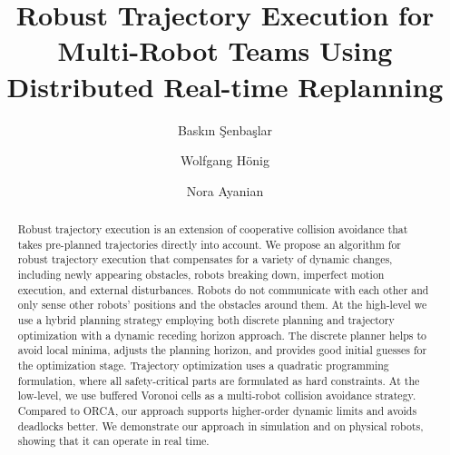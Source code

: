 \documentclass{svproc}
\begin{document}
\mainmatter              %
\title{Robust Trajectory Execution for Multi-Robot Teams Using Distributed Real-time Replanning}
%
\author{Baskın Şenbaşlar \and Wolfgang H\"onig \and
Nora Ayanian}
%
%
%

\maketitle              %

\begin{abstract}
Robust trajectory execution is an extension of cooperative collision avoidance that takes pre-planned trajectories directly into account.
We propose an algorithm for robust trajectory execution that compensates for a variety of dynamic changes, including newly appearing obstacles, robots breaking down, imperfect motion execution, and external disturbances.
Robots do not communicate with each other and only sense other robots' positions and the obstacles around them.
At the high-level we use a hybrid planning strategy employing both discrete planning and trajectory optimization with a dynamic receding horizon approach.
The discrete planner helps to avoid local minima, adjusts the planning horizon, and provides good initial guesses for the optimization stage.
Trajectory optimization uses a quadratic programming formulation, where all safety-critical parts are formulated as hard constraints.
At the low-level, we use buffered Voronoi cells as a multi-robot collision avoidance strategy.
Compared to ORCA, our approach supports higher-order dynamic limits and avoids deadlocks better.
We demonstrate our approach in simulation and on physical robots, showing that it can operate in real time.
\end{abstract}
\end{document}
